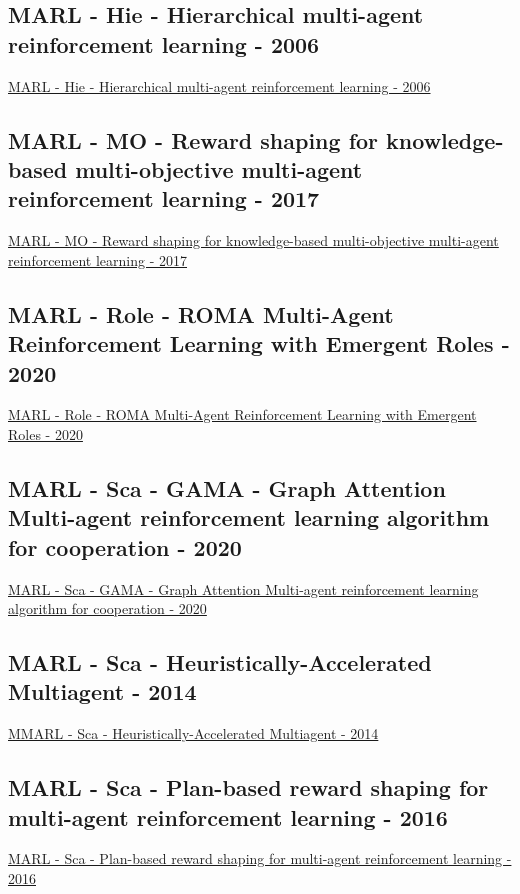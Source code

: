 \subsection{MARL - Hie - Hierarchical multi-agent reinforcement learning - 2006}
\href{https://link.springer.com/article/10.1007/s10458-006-7035-4}{MARL - Hie - Hierarchical multi-agent reinforcement learning - 2006}

\subsection{MARL - MO - Reward shaping for knowledge-based multi-objective multi-agent reinforcement learning - 2017}
\href{https://www.cambridge.org/core/journals/knowledge-engineering-review/article/reward-shaping-for-knowledgebased-multiobjective-multiagent-reinforcement-learning/75F1507F7CAC7C6625F87AE7CD344D52}{MARL - MO - Reward shaping for knowledge-based multi-objective multi-agent reinforcement learning - 2017}

\subsection{MARL - Role - ROMA Multi-Agent Reinforcement Learning with Emergent Roles - 2020}
\href{http://proceedings.mlr.press/v119/wang20f.html}{MARL - Role - ROMA Multi-Agent Reinforcement Learning with Emergent Roles - 2020}

\subsection{MARL - Sca - GAMA - Graph Attention Multi-agent reinforcement learning algorithm for cooperation - 2020}
\href{https://link.springer.com/article/10.1007/s10489-020-01755-8}{MARL - Sca - GAMA - Graph Attention Multi-agent reinforcement learning algorithm for cooperation - 2020}
\subsection{MARL - Sca - Heuristically-Accelerated Multiagent - 2014}
\href{https://ieeexplore.ieee.org/abstract/document/6502216}{MMARL - Sca - Heuristically-Accelerated Multiagent - 2014}



\subsection{MARL - Sca - Plan-based reward shaping for multi-agent reinforcement learning - 2016}
\href{https://www.cambridge.org/core/journals/knowledge-engineering-review/article/planbased-reward-shaping-for-multiagent-reinforcement-learning/B173D25B1006B755667616C3A3EB3BE5}{MARL - Sca - Plan-based reward shaping for multi-agent reinforcement learning - 2016}

